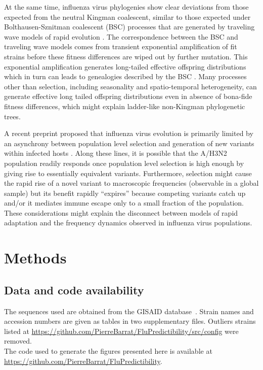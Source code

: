 \documentclass[reprint,amsmath,amssymb,superscriptaddress,showpacs,rmp]{revtex4-1}
\begin{document}
At the same time, influenza virus phylogenies show clear deviations from those expected from the neutral Kingman coalescent, similar to those expected under Bolthausen-Sznitman coalescent (BSC) processes that are generated by traveling wave models of rapid evolution \citep{neher_genealogies_2013,desai_genetic_2013}.
The correspondence between the BSC and traveling wave models comes from transient exponential amplification of fit strains before these fitness differences are wiped out by further mutation. 
This exponential amplification generates long-tailed effective offspring distributions which in turn can leads to genealogies described by the BSC \citep{schweinsberg_coalescent_2003,neher_genealogies_2013}. 
Many processes other than selection, including seasonality and spatio-temporal heterogeneity, can generate effective long tailed offspring distributions even in absence of bona-fide fitness differences, which might explain ladder-like non-Kingman phylogenetic trees.

A recent preprint proposed that influenza virus evolution is primarily limited by an asynchrony between population level selection and generation of new variants within infected hosts \citep{morris_asynchrony_2020}. 
Along these lines, it is possible that the A/H3N2 population readily responds once population level selection is high enough by giving rise to essentially equivalent variants.
Furthermore, selection might cause the rapid rise of a novel variant to macroscopic frequencies (observable in a global sample) but its benefit rapidly ``expires'' because competing variants catch up and/or it mediates immune escape only to a small fraction of the population.  
These considerations might explain the disconnect between models of rapid adaptation and the frequency dynamics observed in influenza virus populations.



\section*{Methods} %
\label{sec:methods}

\subsection*{Data and code availability} %
\label{sub:data}
	The sequences used are obtained from the GISAID database~\cite{shu2017gisaid}. 
	Strain names and accession numbers are given as tables in two supplementary files. Outliers strains listed at \url{https://github.com/PierreBarrat/FluPredictibility/src/config} were removed. \\
	The code used to generate the figures presented here is available at \url{https://github.com/PierreBarrat/FluPredictibility}. 
\end{document}
